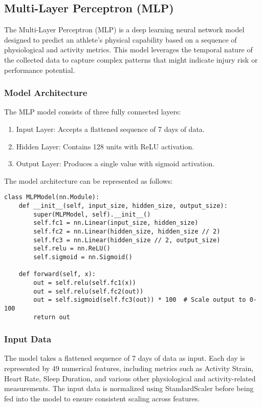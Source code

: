 \documentclass[manuscript,acmsmall,anonymous,review,screen,nonacm=true, authorversion=true]{acmart}
\begin{document}
  \subsection{Multi-Layer Perceptron (MLP)}
  
  The Multi-Layer Perceptron (MLP) is a deep learning neural network model designed to predict an athlete's physical capability based on a sequence of physiological and activity metrics. This model leverages the temporal nature of the collected data to capture complex patterns that might indicate injury risk or performance potential.

  \subsubsection{Model Architecture}

  The MLP model consists of three fully connected layers:

  \begin{enumerate}
    \item Input Layer: Accepts a flattened sequence of 7 days of data.
    \item Hidden Layer: Contains 128 units with ReLU activation.
    \item Output Layer: Produces a single value with sigmoid activation.
  \end{enumerate}

  The model architecture can be represented as follows:

  \begin{verbatim}
class MLPModel(nn.Module):
    def __init__(self, input_size, hidden_size, output_size):
        super(MLPModel, self).__init__()
        self.fc1 = nn.Linear(input_size, hidden_size)
        self.fc2 = nn.Linear(hidden_size, hidden_size // 2)
        self.fc3 = nn.Linear(hidden_size // 2, output_size)
        self.relu = nn.ReLU()
        self.sigmoid = nn.Sigmoid()

    def forward(self, x):
        out = self.relu(self.fc1(x))
        out = self.relu(self.fc2(out))
        out = self.sigmoid(self.fc3(out)) * 100  # Scale output to 0-100
        return out
  \end{verbatim}

  \subsubsection{Input Data}

  The model takes a flattened sequence of 7 days of data as input. Each day is represented by 49 numerical features, including metrics such as Activity Strain, Heart Rate, Sleep Duration, and various other physiological and activity-related measurements. The input data is normalized using StandardScaler before being fed into the model to ensure consistent scaling across features.
\end{document}
